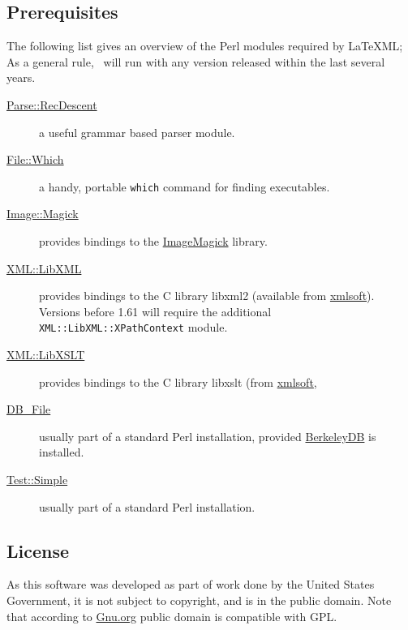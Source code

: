 \documentclass{article}
\begin{document}
\subsection{Prerequisites}\label{prerequisites}
The following list gives an overview of the Perl modules required by LaTeXML;
As a general rule, \LaTeXML\ will run with any version released within
the last several years.
\begin{description}
\item[\href{http://search.cpan.org/search?query=Parse::RecDescent&mode=module}{Parse::RecDescent}]
    a useful grammar based parser module.
\item[\href{http://search.cpan.org/search?query=File::Which&mode=module}{File::Which}]
    a handy, portable \texttt{which} command for finding executables.
\item[\href{http://search.cpan.org/search?query=Image::Magick&mode=module}{Image::Magick}]
    provides bindings to the \href{http://www.imagemagick.org/}{ImageMagick} library.
\item[\href{http://search.cpan.org/search?query=XML::LibXML&mode=module}{XML::LibXML}]
    provides bindings to the C library libxml2
    (available from \href{http://www.xmlsoft.org}{xmlsoft}).
    Versions before 1.61 will require the additional \texttt{XML::LibXML::XPathContext} module.
\item[\href{http://search.cpan.org/search?query=XML::LibXSLT&mode=module}{XML::LibXSLT}]
    provides bindings to the C library libxslt
    (from \href{http://www.xmlsoft.org}{xmlsoft},
\item[\href{http://search.cpan.org/search?query=DB_File&mode=module}{DB\_File}]
    usually part of a standard Perl installation, provided
    \href{http://www.sleepycat.com}{BerkeleyDB} is installed.
\item[\href{http://search.cpan.org/search?query=Test::Simple&mode=module}{Test::Simple}]
    usually part of a standard Perl installation.
\end{description}

\subsection{License}\label{license}
As this software was developed as part of work done by the
United States Government, it is not subject to copyright,
and is in the public domain.
Note that according to
\href{http://www.gnu.org/licences/license-list.html#PublicDomain}{Gnu.org}
public domain is compatible with GPL.
\end{document}
